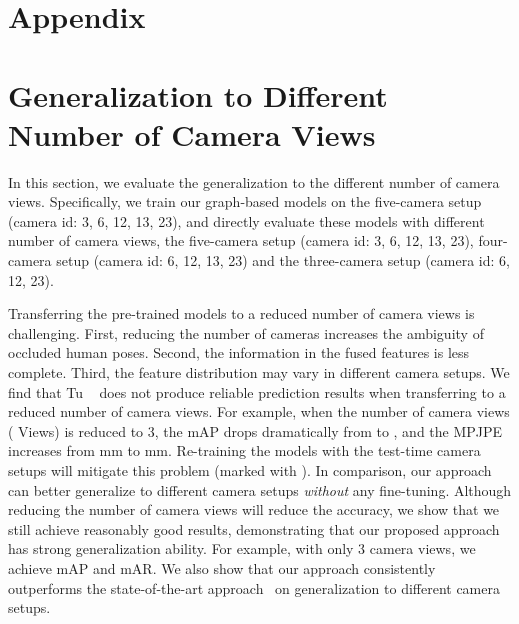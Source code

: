 \documentclass[10pt,twocolumn,letterpaper]{article}
\begin{document}
{\small


}

\newpage

\appendix
\section*{\Large Appendix}
\setcounter{table}{0}
\renewcommand{\thetable}{A\arabic{table}}
\setcounter{figure}{0}
\renewcommand{\thefigure}{A\arabic{figure}}


\section{Generalization to Different Number of Camera Views}

In this section, we evaluate the generalization to the different number of camera views. Specifically, we train our graph-based models on the five-camera setup (camera id: 3, 6, 12, 13, 23), and directly evaluate these models with different number of camera views, \ie the five-camera setup (camera id: 3, 6, 12, 13, 23), four-camera setup (camera id: 6, 12, 13, 23) and the three-camera setup (camera id: 6, 12, 23). 

Transferring the pre-trained models to a reduced number of camera views is challenging. First, reducing the number of cameras increases the ambiguity of occluded human poses. Second, the information in the fused features is less complete. Third, the feature distribution may vary in different camera setups. We find that Tu \etal~\cite{tu2020voxelpose} does not produce reliable prediction results when transferring to a reduced number of camera views. For example, when the number of camera views ( Views) is reduced to 3, the mAP drops dramatically from  to , and the MPJPE increases from mm to mm. Re-training the models with the test-time camera setups will mitigate this problem (marked with ). In comparison, our approach can better generalize to different camera setups \emph{without} any fine-tuning. Although reducing the number of camera views will reduce the accuracy, we show that we still achieve reasonably good results, demonstrating that our proposed approach has strong generalization ability. For example, with only 3 camera views, we achieve mAP and mAR. We also show that our approach consistently outperforms the state-of-the-art approach~\cite{tu2020voxelpose} on generalization to different camera setups. 
\end{document}
